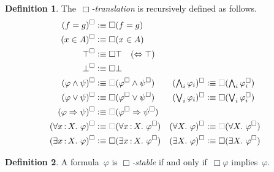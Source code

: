 \documentclass[10pt]{amsart}
\theoremstyle{definition}
\newtheorem{defn}{Definition}[section]
\theoremstyle{plain}
\theoremstyle{remark}
\newcommand{\?}{\,{:}\,}
\renewcommand{\_}{\mathpunct{.}\,}
\newcommand{\defequiv}{\vcentcolon\equiv}
\begin{document}
\begin{defn}The~\emph{$\Box$-translation} is recursively defined as follows.
\newcommand{\optBox}{\textcolor{gray}{\Box}}
\begin{align*}
  (f = g)^\Box &\defequiv \Box(f = g) \\
  (x \in A)^\Box &\defequiv \Box(x \in A) \\
  \top^\Box &\defequiv \Box\top \quad \text{($\Leftrightarrow \top$)} \\
  \bot^\Box &\defequiv \Box\bot \\
  (\varphi \wedge \psi)^\Box &\defequiv \optBox(\varphi^\Box \wedge \psi^\Box) &
  \textstyle (\bigwedge_i \varphi_i)^\Box &\defequiv \textstyle \optBox(\bigwedge_i \varphi_i^\Box) \\
  (\varphi \vee \psi)^\Box &\defequiv \Box(\varphi^\Box \vee \psi^\Box) &
  \textstyle (\bigvee_i \varphi_i)^\Box &\defequiv \textstyle \Box(\bigvee_i \varphi_i^\Box) \\
  (\varphi \Rightarrow \psi)^\Box &\defequiv \optBox(\varphi^\Box \Rightarrow \psi^\Box) \\
  (\forall x\?X\_ \varphi)^\Box &\defequiv \optBox(\forall x\?X\_ \varphi^\Box) &
  (\forall X\_ \varphi)^\Box &\defequiv \optBox(\forall X\_ \varphi^\Box) \\
  (\exists x\?X\_ \varphi)^\Box &\defequiv \Box(\exists x\?X\_ \varphi^\Box) &
  (\exists X\_ \varphi)^\Box &\defequiv \Box(\exists X\_ \varphi^\Box)
\end{align*}
\end{defn}

\begin{defn}A formula~$\varphi$ is \emph{$\Box$-stable} if and only
if~$\Box\varphi$ implies~$\varphi$.\end{defn}
\end{document}
